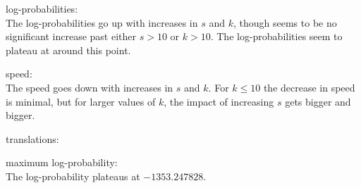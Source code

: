 \documentclass[answers]{exam}
\begin{document}
\begin{questions}
\begin{framed}
\begin{compactenum}[a.]
\item log-probabilities:\\
  The log-probabilities go up with increases in $s$ and $k$, though seems to be no
  significant increase past either $s > 10$ or $k > 10$. The log-probabilities
  seem to plateau at around this point.
\item speed:\\
  The speed goes down with increases in $s$ and $k$. For $k \leq 10$ the
  decrease in speed is minimal, but for larger values of $k$, the impact of
  increasing $s$ gets bigger and bigger.
\item translations:
\item maximum log-probability:\\
  The log-probability plateaus at $-1353.247828$.
\end{compactenum}
\end{framed}



\end{questions}
\end{document}

